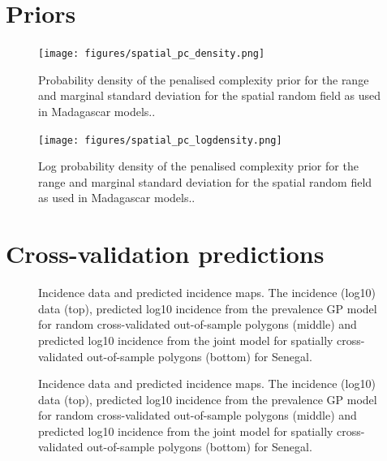 \documentclass[10pt,a4]{article}
\begin{document}
\clearpage
\section{Priors}



\begin{figure}[h!]
\centering

\texttt{[image: figures/spatial\_pc\_density.png]}

\caption{Probability density of the penalised complexity prior for the range and marginal standard deviation for the spatial random field as used in Madagascar models..}
\label{dens}
\end{figure}



\begin{figure}[h!]
\centering

\texttt{[image: figures/spatial\_pc\_logdensity.png]}


\caption{Log probability density of the penalised complexity prior for the range and marginal standard deviation for the spatial random field as used in Madagascar models..}
\label{logdens}
\end{figure}




\clearpage
\section{Cross-validation predictions}


\begin{figure}[h!]
\caption{\label{predobsmapsen1}
Incidence data and predicted incidence maps.
The incidence (log10) data (top), predicted log10 incidence from the prevalence GP model for random cross-validated out-of-sample polygons (middle) and predicted log10 incidence from the joint model for spatially cross-validated out-of-sample polygons (bottom) for Senegal.
}
\end{figure}



\begin{figure}[h!]
\caption{\label{predobsmapsen2}
Incidence data and predicted incidence maps.
The incidence (log10) data (top), predicted log10 incidence from the prevalence GP model for random cross-validated out-of-sample polygons (middle) and predicted log10 incidence from the joint model for spatially cross-validated out-of-sample polygons (bottom) for Senegal.
}
\end{figure}
\end{document}
